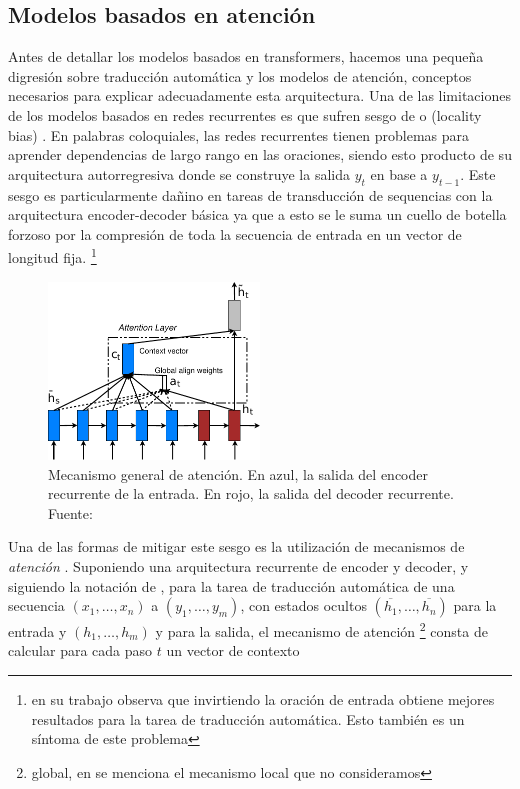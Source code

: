 \subsection{Modelos basados en atención}
\label{sec:02_transformers}

Antes de detallar los modelos basados en transformers, hacemos una pequeña digresión sobre traducción automática y los modelos de atención, conceptos necesarios para explicar adecuadamente esta arquitectura. Una de las limitaciones de los modelos basados en redes recurrentes es que sufren sesgo de  o  (locality bias) \cite{battaglia2018relational}. En palabras coloquiales, las redes recurrentes tienen problemas para aprender dependencias de largo rango en las oraciones, siendo esto producto de su arquitectura autorregresiva donde se construye la salida $y_t$ en base a $y_{t-1}$. Este sesgo es particularmente dañino en tareas de transducción de sequencias con la arquitectura encoder-decoder básica ya que a esto se le suma un cuello de botella forzoso por la compresión de toda la secuencia de entrada en un vector de longitud fija. \footnote{\citet{sutskever2014sequence} en su trabajo observa que invirtiendo la oración de entrada obtiene mejores resultados para la tarea de traducción automática. Esto también es un síntoma de este problema}


\begin{figure}[t]
    \centering
    \includegraphics[width=0.5\textwidth]{img/02/attention_model.pdf}
    \caption{Mecanismo general de atención. En azul, la salida del encoder recurrente de la entrada. En rojo, la salida del decoder recurrente. Fuente: \citet{luong2015effective}}
    \label{fig:attention_mechanism}
\end{figure}


Una de las formas de mitigar este sesgo es la utilización de mecanismos de \emph{atención} \cite{bahdanau2014neural}. Suponiendo una arquitectura recurrente de encoder y decoder, y siguiendo la notación de \citet{luong2015effective}, para la tarea de traducción automática de una secuencia $(x_1, \ldots , x_n)$ a $(y_1, \ldots , y_m)$, con estados ocultos $(\overline{h_1}, \ldots , \overline{h_n})$ para la entrada y $(h_1, \ldots , h_m)$ y para la salida, el mecanismo de atención \footnote{global, en \citet{luong2015effective} se menciona el mecanismo local que no consideramos} consta de calcular para cada paso $t$ un vector de contexto

